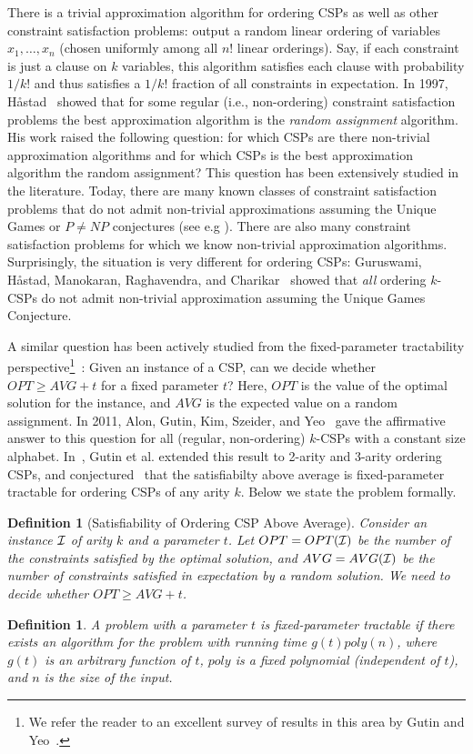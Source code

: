 \documentclass[11pt]{article}
\newtheorem{definition}[theorem]{Definition}
\begin{document}
There is a trivial approximation algorithm for ordering CSPs as well as other constraint satisfaction problems: output a random linear ordering of variables $x_1,\dots, x_n$ (chosen uniformly among all $n!$ linear orderings). Say, if each constraint is just a clause on $k$ variables, this algorithm satisfies each clause with probability $1/k!$ and thus satisfies a $1/k!$ fraction of all constraints in expectation.
In 1997, H\aa{}stad~\cite{Hastad} showed that for some regular (i.e., non-ordering) constraint satisfaction problems the best approximation algorithm is the \textit{random assignment} algorithm. His work raised
the following question: for which CSPs are there non-trivial approximation algorithms and
for which CSPs is the best approximation algorithm the random assignment?
This question has been extensively studied in the literature. Today, there are
many known classes of constraint satisfaction problems that do not admit non-trivial approximations
assuming the Unique Games or $P\neq NP$ conjectures (see e.g \cite{Hastad, AM, GR, Chan}).
There are also many constraint satisfaction problems for which we know non-trivial approximation algorithms.
Surprisingly, the situation is very different for ordering CSPs:
Guruswami, H\aa{}stad,
Manokaran, Raghavendra, and Charikar~\cite{GHMRC} showed that
\textit{all} ordering $k$-CSPs do not admit non-trivial approximation assuming the Unique Games Conjecture.

A similar question has been actively studied from the fixed-parameter tractability
perspective\footnote{We refer the reader to an excellent survey of results in this area by Gutin and Yeo~\cite{GY}.}~\cite{AGKSY, CFGJRTY, CGJRS,GKSY,KW,MR,RS}: Given an instance of a CSP, can we decide whether
$OPT\geq AVG+t$ for a fixed parameter $t$? Here, $OPT$ is the value of the optimal solution for the instance,
and $AVG$ is the expected value on a  random assignment.
In 2011, Alon, Gutin, Kim, Szeider, and Yeo~\cite{AGKSY} gave the affirmative answer to this question for all (regular, non-ordering) $k$-CSPs
with a constant size alphabet. In~\cite{GKSY, GIMY, GKMY}, Gutin et al. extended this result to
2-arity and 3-arity ordering CSPs, and conjectured~\cite{GIMY} that the satisfiabilty above average is fixed-parameter tractable for ordering CSPs of any arity $k$.
Below we state the problem formally.

\begin{definition}[Satisfiability of Ordering CSP Above Average]\label{def:above-avg}
Consider an instance $\cal I$ of arity $k$ and a parameter $t$. Let $OPT = OPT({\cal I})$ be the number of the constraints satisfied by the optimal solution, and
$AVG = AVG({\cal I})$ be the number of constraints satisfied in expectation by a random solution. We need to decide whether $OPT \geq AVG + t$.
\end{definition}
\begin{definition}
A problem with a parameter $t$ is fixed-parameter tractable	if there exists an
algorithm for the problem with running time $g(t) poly(n)$, where $g(t)$ is an arbitrary function of $t$, $poly$ is a fixed polynomial (independent of $t$),
and $n$ is the size of the input.
\end{definition}
\end{document}

